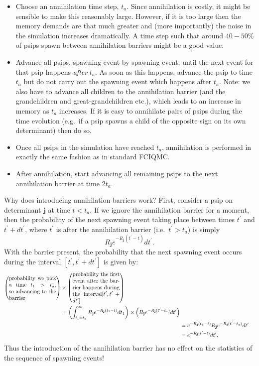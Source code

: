 \documentclass[a4paper, 11pt]{article}
\newcommand{\bj}{\mathbf{j}}
\begin{document}
\begin{itemize}
\item Choose an annihilation time step, $t_a$.  Since annihilation is costly, it might be sensible to make this reasonably large.  However, if it is too large then the memory demands are that much greater and (more importantly) the noise in the simulation increases dramatically.  A time step such that around $40-50\%$ of psips spawn between annihilation barriers might be a good value.
\item Advance all psips, spawning event by spawning event, until the next event for that psip happens \emph{after} $t_a$.  As soon as this happens, advance the psip to time $t_a$ but do not carry out the spawning event which happens after $t_a$.  Note: we also have to advance all children to the annihilation barrier (and the grandchildren and great-grandchildren etc.), which leads to an increase in memory as $t_a$ increases.  If it is easy to annihilate pairs of psips during the time evolution (e.g.\ if a psip spawns a child of the opposite sign on its own determinant) then do so.
\item Once all psips in the simulation have reached $t_a$, annihilation is performed in exactly the same fashion as in standard FCIQMC.
\item After annihilation, start advancing all remaining psips to the next annihilation barrier at time $2t_a$.
\end{itemize}

Why does introducing annihilation barriers work?  First, consider a psip on determinant $\bj$ at time $t<t_a$.  If we ignore the annihilation barrier for a moment, then the probability of the next spawning event taking place between times $t^\prime$ and $t^\prime+dt^\prime$, where $t^\prime$ is after the annihilation barrier (i.e.\ $t^\prime>t_a$) is simply
\begin{equation}
R_\bj e^{-R_\bj (t^\prime - t)} dt^\prime.
\end{equation}
With the barrier present, the probability that the next spawning event occurs during the interval $[t^\prime,t^\prime+dt^\prime]$ is given by:
\begin{align}
\begin{split}
\left(\textrm{\parbox{3cm}{probability we pick a time $t_1>t_a$, so advancing to the barrier}}\right) &\times \left(\textrm{\parbox{3cm}{probability the first event after the barrier happens during the interval$[t^\prime,t^\prime+dt^\prime]$}}\right) \\
&=  \left(\int_{t_1=t_a}^\infty R_\bj e^{-R_\bj(t_1-t)} dt_1\right) \times \left(R_\bj e^{-R_\bj(t^\prime-t_a)}dt^\prime\right)
\end{split} \\
&= e^{-R_\bj(t_a-t)} R_\bj e^{-R_\bj(t^\prime-t_a)} dt^\prime \\
&= e^{-R_\bj(t^\prime-t)} dt^\prime.
\end{align}
Thus the introduction of the annihilation barrier has no effect on the statistics of the sequence of spawning events!
\end{document}
